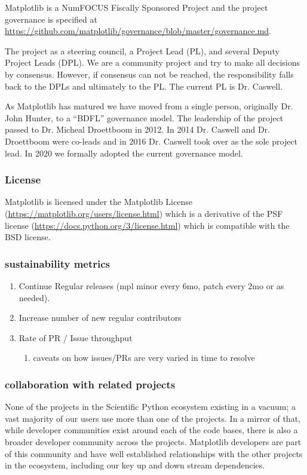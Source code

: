 \documentclass[12pt]{article}
\numberwithin{page}{section}
\begin{document}
Matplotlib is a NumFOCUS Fiscally Sponsored Project and
the project governance is specified at
\url{https://github.com/matplotlib/governance/blob/master/governance.md}.

The project as a steering council, a Project Lead (PL), and several
Deputy Project Leads (DPL).  We are a community project and try to
make all decisions by consensus.  However, if consensus can not be
reached, the responsibility falls back to the DPLs and ultimately to
the PL.  The current PL is Dr. Caswell.

As Matplotlib has matured we have moved from a single person,
originally Dr. John Hunter, to a ``BDFL'' governance model.  The
leadership of the project passed to Dr. Micheal Droettboom in 2012.
In 2014 Dr. Caswell and Dr. Droettboom were co-leads and in 2016
Dr. Caswell took over as the sole project lead.  In 2020 we formally
adopted the current governance model.

\subsubsection{License}

Matplotlib is licensed under the Matplotlib License
(\url{https://matplotlib.org/users/license.html}) which is a
derivative of the PSF license
(\url{https://docs.python.org/3/license.html}) which is compatible
with the BSD license.


\subsubsection{sustainability metrics}
\begin{enumerate}
\item Continue Regular releases (mpl minor every 6mo, patch every 2mo
  or as needed).
\item Increase number of new regular contributors
\item Rate of PR / Issue throughput
  \begin{enumerate}
  \item caveats on how issues/PRs are very varied in time to resolve
  \end{enumerate}
\end{enumerate}

\subsubsection{collaboration with related projects}

None of the projects in the Scientific Python ecosystem existing in a
vacuum; a vast majority of our users use more than one of the
projects.  In a mirror of that, while developer communities exist
around each of the code bases, there is also a broader developer
community across the projects.  Matplotlib developers are part of this
community and have well established relationships with the other
projects in the ecosystem, including our key up and down stream
dependencies.
\end{document}
